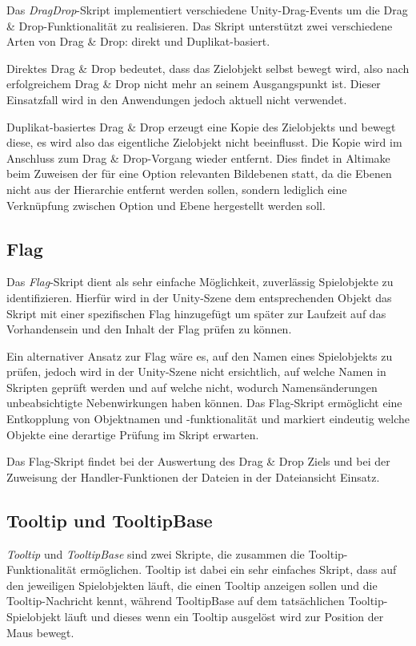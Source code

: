 \documentclass[oneside]{ausarbeitung}
\begin{document}
Das \textit{DragDrop}-Skript implementiert verschiedene Unity-Drag-Events um die Drag \& Drop-Funktionalität zu realisieren. Das Skript unterstützt zwei verschiedene Arten von Drag \& Drop: direkt und Duplikat-basiert. 

Direktes Drag \& Drop bedeutet, dass das Zielobjekt selbst bewegt wird, also nach erfolgreichem Drag \& Drop nicht mehr an seinem Ausgangspunkt ist. Dieser Einsatzfall wird in den Anwendungen jedoch aktuell nicht verwendet.

Duplikat-basiertes Drag \& Drop erzeugt eine Kopie des Zielobjekts und bewegt diese, es wird also das eigentliche Zielobjekt nicht beeinflusst. Die Kopie wird im Anschluss zum Drag \& Drop-Vorgang wieder entfernt. Dies findet in Altimake beim Zuweisen der für eine Option relevanten Bildebenen statt, da die Ebenen nicht aus der Hierarchie entfernt werden sollen, sondern lediglich eine Verknüpfung zwischen Option und Ebene hergestellt werden soll.



\subsection{Flag}

Das \textit{Flag}-Skript dient als sehr einfache Möglichkeit, zuverlässig Spielobjekte zu identifizieren. Hierfür wird in der Unity-Szene dem entsprechenden Objekt das Skript mit einer spezifischen Flag hinzugefügt um später zur Laufzeit auf das Vorhandensein und den Inhalt der Flag prüfen zu können.

Ein alternativer Ansatz zur Flag wäre es, auf den Namen eines Spielobjekts zu prüfen, jedoch wird in der Unity-Szene nicht ersichtlich, auf welche Namen in Skripten geprüft werden und auf welche nicht, wodurch Namensänderungen unbeabsichtigte Nebenwirkungen haben können. Das Flag-Skript ermöglicht eine Entkopplung von Objektnamen und -funktionalität und markiert eindeutig welche Objekte eine derartige Prüfung im Skript erwarten.

Das Flag-Skript findet bei der Auswertung des Drag \& Drop Ziels und bei der Zuweisung der Handler-Funktionen der Dateien in der Dateiansicht Einsatz.



\subsection{Tooltip und TooltipBase}

\textit{Tooltip} und \textit{TooltipBase} sind zwei Skripte, die zusammen die Tooltip-Funktionalität ermöglichen. Tooltip ist dabei ein sehr einfaches Skript, dass auf den jeweiligen Spielobjekten läuft, die einen Tooltip anzeigen sollen und die Tooltip-Nachricht kennt, während TooltipBase auf dem tatsächlichen Tooltip-Spielobjekt läuft und dieses wenn ein Tooltip ausgelöst wird zur Position der Maus bewegt.
\end{document}
